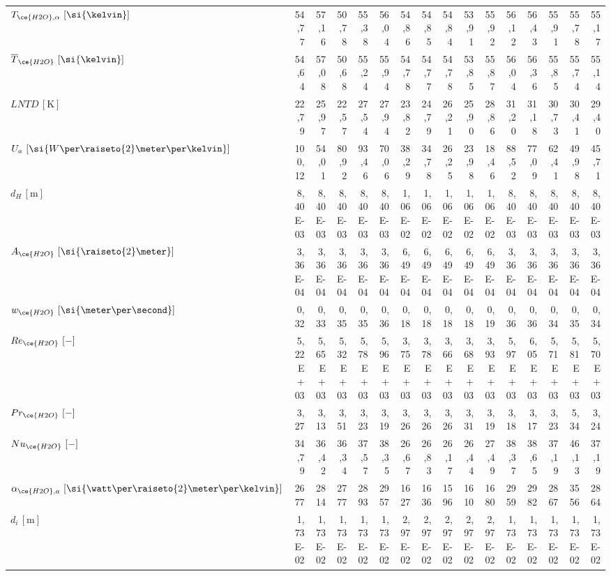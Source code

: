 \begin{sidewaystable}[h!]
{\begin{tabular}{l|rrrrr|rrrrr|rrrrr}
			$ T_{\ce{H2O},\alpha }\, \left[\si{\kelvin}\right]$ & 54,77 & 57,16 & 50,78 & 55,38 & 56,04 & 54,86 & 54,85 & 54,84 & 53,91 & 55,92 & 56,12 & 56,43 & 55,91 & 55,78 & 55,17 \\
			$\overline{T}_{\ce{H2O}} \, \left[\si{\kelvin}\right]$ & 54,64 & 57,08 & 50,68 & 55,24 & 55,94 & 54,78 & 54,77 & 54,78 & 53,85 & 55,87 & 56,04 & 56,36 & 55,85 & 55,74 & 55,14 \\
			$LNTD \, \left[\si{\kelvin}\right]$ & 22,79 & 25,97 & 22,57 & 27,54 & 27,94 & 23,82 & 24,79 & 26,21 & 25,90 & 28,86 & 31,20 & 31,18 & 30,73 & 30,41 & 29,40 \\
			$U_a \, \left[\si{W \per \raiseto{2}\meter \per \kelvin}\right] $& 100,12 & 54,01 & 80,92 & 93,46 & 70,06 & 38,29 & 34,78 & 26,25 & 23,98 & 18,46 & 88,52 & 77,09 & 62,41 & 49,98 & 45,71 \\
			$d_H \, \left[\si{\meter}\right] $& 8,40E-03 & 8,40E-03 & 8,40E-03 & 8,40E-03 & 8,40E-03 & 1,06E-02 & 1,06E-02 & 1,06E-02 & 1,06E-02 & 1,06E-02 & 8,40E-03 & 8,40E-03 & 8,40E-03 & 8,40E-03 & 8,40E-03 \\
			$A_{\ce{H2O}} \, \left[\si{\raiseto{2} \meter}\right]$ & 3,36E-04 & 3,36E-04 & 3,36E-04 & 3,36E-04 & 3,36E-04 & 6,49E-04 & 6,49E-04 & 6,49E-04 & 6,49E-04 & 6,49E-04 & 3,36E-04 & 3,36E-04 & 3,36E-04 & 3,36E-04 & 3,36E-04 \\
			$w_{\ce{H2O}} \, \left[\si{\meter\per\second}\right]$ & 0,32  & 0,33  & 0,35  & 0,35  & 0,36  & 0,18  & 0,18  & 0,18  & 0,18  & 0,19  & 0,36  & 0,36  & 0,34  & 0,35  & 0,34 \\
			$Re_{\ce{H2O}} \, \left[-\right]$ & 5,22E+03 & 5,65E+03 & 5,32E+03 & 5,78E+03 & 5,96E+03 & 3,75E+03 & 3,78E+03 & 3,66E+03 & 3,68E+03 & 3,93E+03 & 5,97E+03 & 6,05E+03 & 5,71E+03 & 5,81E+03 & 5,70E+03 \\
			$Pr_{\ce{H2O}} \, \left[-\right]$& 3,27  & 3,13  & 3,51  & 3,23  & 3,19  & 3,26  & 3,26  & 3,26  & 3,31  & 3,19  & 3,18  & 3,17  & 3,23  & 5,34  & 3,24 \\
			$Nu_{\ce{H2O}} \, \left[-\right]$& 34,79 & 36,42 & 36,34 & 37,57 & 38,35 & 26,67 & 26,83 & 26,17 & 26,44 & 27,49 & 38,37 & 38,65 & 37,19 & 46,13 & 37,19 \\
			$\alpha_{\ce{H2O},a} \, \left[\si{\watt\per\raiseto{2}\meter\per\kelvin}\right]$ & 2677  & 2814  & 2777  & 2893  & 2957  & 1627  & 1636  & 1596  & 1610  & 1680  & 2959  & 2982  & 2867  & 3556  & 2864 \\
			$d_i \, \left[\si{\meter}\right]$ & 1,73E-02 & 1,73E-02 & 1,73E-02 & 1,73E-02 & 1,73E-02 & 2,97E-02 & 2,97E-02 & 2,97E-02 & 2,97E-02 & 2,97E-02 & 1,73E-02 & 1,73E-02 & 1,73E-02 & 1,73E-02 & 1,73E-02 \\

\end{tabular}}
\end{sidewaystable}
